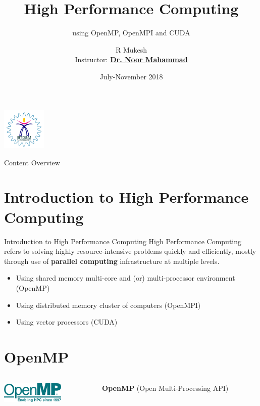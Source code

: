 \documentclass{beamer}
\title{High Performance Computing}
\subtitle{\small{using OpenMP, OpenMPI and CUDA}}
\author[R Mukesh]{R Mukesh\\{\scriptsize  Instructor: \href{https://scholar.google.co.in/citations?user=sbzsjNcAAAAJ&hl=en&oi=sra}{\textbf{Dr. Noor Mahammad}}}}
\institute{IIITDM Kancheepuram}
\date{July-November 2018}
\begin{document}
	
	{
		\begin{frame}
			\titlepage
			\centering
			\includegraphics[height=2cm]{iiitdmlogo}
		\end{frame}
	}
	
	\begin{frame}{Content Overview}
		\scriptsize
		\tableofcontents
	\end{frame}
	
	\section{Introduction to High Performance Computing}
		\begin{frame}{Introduction to High Performance Computing}
			High Performance Computing refers to solving highly resource-intensive problems quickly and efficiently, mostly through use of \textbf{parallel computing} infrastructure at multiple levels.
			\linebreak
			\begin{itemize}
				\item Using shared memory multi-core and (or) multi-processor environment (OpenMP)
				\item Using distributed memory cluster of computers (OpenMPI)
				\item Using vector processors (CUDA)
			\end{itemize}
			
		\end{frame}
	
	\section{OpenMP}
		\begin{frame}
			\begin{columns}
				\begin{column}{0.3\textwidth}
					\includegraphics[width=3cm]{openmplogo}		
				\end{column}
			
				\begin{column}{0.7\textwidth}
					\begin{block}{}
						\vspace{8pt}
						\centering
						\textbf{\Huge{OpenMP}}
						\linebreak
						{\small (Open Multi-Processing API)}
						\vspace{6pt}
					\end{block}
				\end{column}
			\end{columns}
			
		\end{frame}
		
\end{document}
